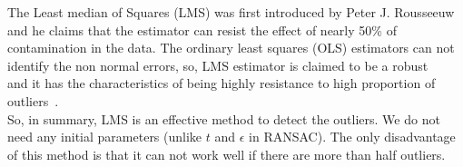 \noindent The Least median of Squares (LMS) was first introduced by Peter J. Rousseeuw~\cite{rousseeuw:84} and he claims that the estimator can resist the effect of nearly 50\% of contamination in the data. The ordinary least squares (OLS) estimators can not identify the non normal errors, so, LMS estimator is claimed to be a robust~\cite{rousseeuw:84}~\cite{onder:01} and it has the characteristics of being highly resistance to high proportion of outliers~\cite{onder:01}.\\

\noindent So, in summary, LMS is an effective method to detect the outliers. We do not need any initial parameters (unlike $t$ and $\epsilon$ in RANSAC). The only disadvantage of this method is that it can not work well if there are more than half outliers.  

\newpage


 


